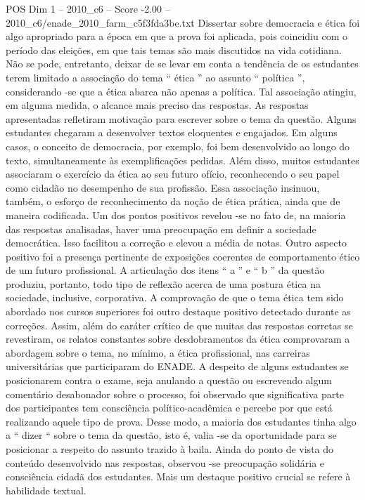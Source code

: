 \begin{textsample}{POS Dim 1 – 2010\_c6 – Score -2.00 – 2010\_c6/enade\_2010\_farm\_c5f3fda3be.txt}
Dissertar sobre democracia e ética foi algo apropriado para a época em que a prova foi aplicada, pois coincidiu com o período das eleições, em que tais temas são mais discutidos na vida cotidiana.
Não se pode, entretanto, deixar de se levar em conta a tendência de os estudantes terem limitado a associação do tema “ ética ” ao assunto “ política ”, considerando -se que a ética abarca não apenas a política.
Tal associação atingiu, em alguma medida, o alcance mais preciso das respostas.
As respostas apresentadas refletiram motivação para escrever sobre o tema da questão.
Alguns estudantes chegaram a desenvolver textos eloquentes e engajados.
Em alguns casos, o conceito de democracia, por exemplo, foi bem desenvolvido ao longo do texto, simultaneamente às exemplificações pedidas.
Além disso, muitos estudantes associaram o exercício da ética ao seu futuro ofício, reconhecendo o seu papel como cidadão no desempenho de sua profissão.
Essa associação insinuou, também, o esforço de reconhecimento da noção de ética prática, ainda que de maneira codificada.
Um dos pontos positivos revelou -se no fato de, na maioria das respostas analisadas, haver uma preocupação em definir a sociedade democrática.
Isso facilitou a correção e elevou a média de notas.
Outro aspecto positivo foi a presença pertinente de exposições coerentes de comportamento ético de um futuro profissional.
A articulação dos itens “ a ” e “ b ” da questão produziu, portanto, todo tipo de reflexão acerca de uma postura ética na sociedade, inclusive, corporativa.
A comprovação de que o tema ética tem sido abordado nos cursos superiores foi outro destaque positivo detectado durante as correções.
Assim, além do caráter crítico de que muitas das respostas corretas se revestiram, os relatos constantes sobre desdobramentos da ética comprovaram a abordagem sobre o tema, no mínimo, a ética profissional, nas carreiras universitárias que participaram do ENADE.
A despeito de alguns estudantes se posicionarem contra o exame, seja anulando a questão ou escrevendo algum comentário desabonador sobre o processo, foi observado que significativa parte dos participantes tem consciência político-acadêmica e percebe por que está realizando aquele tipo de prova.
Desse modo, a maioria dos estudantes tinha algo a “ dizer “ sobre o tema da questão, isto é, valia -se da oportunidade para se posicionar a respeito do assunto trazido à baila.
Ainda do ponto de vista do conteúdo desenvolvido nas respostas, observou -se preocupação solidária e consciência cidadã dos estudantes.
Mais um destaque positivo crucial se refere à habilidade textual.

\end{textsample}
